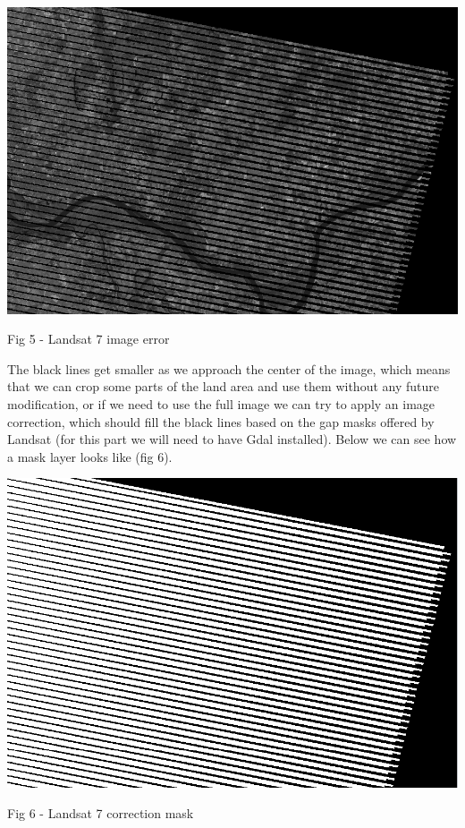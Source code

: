 \documentclass[12pt, a4paper]{report}
\begin{document}
\includegraphics[scale=0.54, center]{landsat_black_stripes.png} 
\begin{center}
Fig 5 - Landsat 7 image error
\end{center}
\par 

\quad
The black lines get smaller as we approach the center of the image, which means that we can crop some parts of the land area and use them without any future modification, or if we need to use the full image we can try to apply an image correction, which should fill the black lines based on the gap masks offered by Landsat (for this part we will need to have Gdal installed). Below we can see how a mask layer looks like (fig 6).
\par 


\bigskip

\includegraphics[scale=0.54, center]{landsat_black_stripes_correction.png} 
\begin{center}
Fig 6 - Landsat 7 correction mask
\end{center}
\par 
\end{document}
